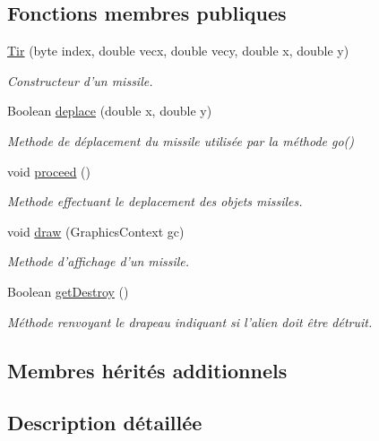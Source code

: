 \subsection*{Fonctions membres publiques}
\begin{DoxyCompactItemize}
\item 
\hyperlink{class_tir_a8841debca4a61907e5837346d864886c}{Tir} (byte index, double vecx, double vecy, double x, double y)
\begin{DoxyCompactList}\small\item\em Constructeur d'un missile. \end{DoxyCompactList}\item 
Boolean \hyperlink{class_tir_a46f4dcb5816374e482b88f371048ff37}{deplace} (double x, double y)
\begin{DoxyCompactList}\small\item\em Methode de déplacement du missile utilisée par la méthode go() \end{DoxyCompactList}\item 
void \hyperlink{class_tir_a0b2df8832aa86ef2ba9a5835fe2b99fe}{proceed} ()
\begin{DoxyCompactList}\small\item\em Methode effectuant le deplacement des objets missiles. \end{DoxyCompactList}\item 
void \hyperlink{class_tir_a7c05e3f344068c7cc9cd802d0e5beefe}{draw} (Graphics\-Context gc)
\begin{DoxyCompactList}\small\item\em Methode d'affichage d'un missile. \end{DoxyCompactList}\item 
Boolean \hyperlink{class_tir_a9e55e211b9e34cd50e32fae6f066eb7c}{get\-Destroy} ()
\begin{DoxyCompactList}\small\item\em Méthode renvoyant le drapeau indiquant si l'alien doit être détruit. \end{DoxyCompactList}\end{DoxyCompactItemize}
\subsection*{Membres hérités additionnels}


\subsection{Description détaillée}


